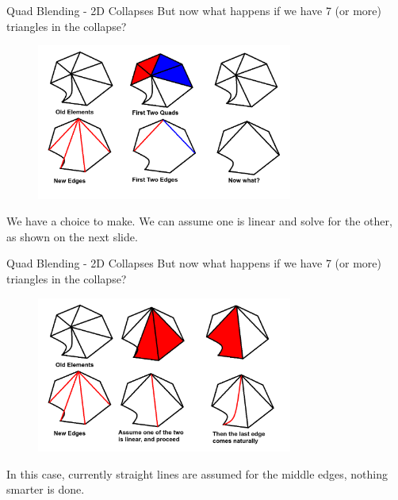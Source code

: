 \documentclass[12pt]{beamer}
\begin{document}
\begin{frame}{Quad Blending - 2D Collapses}
But now what happens if we have 7 (or more) triangles in the collapse?
\begin{figure}
  \centering
  \includegraphics[width=0.75\textwidth]{bezier_images/collapse11.png} 
\end{figure}
We have a choice to make.  We can assume one is linear and solve for the other, as shown on the next slide.
\end{frame}
\begin{frame}{Quad Blending - 2D Collapses}
But now what happens if we have 7 (or more) triangles in the collapse?
\begin{figure}
  \centering
  \includegraphics[width=0.75\textwidth]{bezier_images/collapse12.png} 
\end{figure}
In this case, currently straight lines are assumed for the middle edges, nothing smarter is done.
\end{frame}
\end{document}
